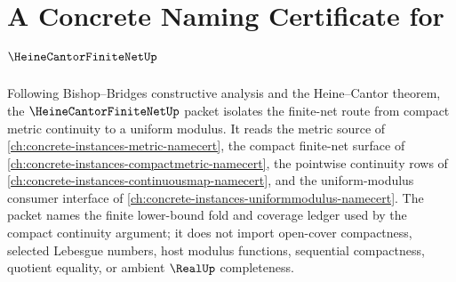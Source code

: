 \chapter{A Concrete Naming Certificate for $\HeineCantorFiniteNetUp$}
\label{ch:concrete-instances-heine-cantor-finite-net-namecert}

Following Bishop--Bridges constructive analysis and the Heine--Cantor theorem, the $\HeineCantorFiniteNetUp$ packet isolates the finite-net route from compact metric continuity to a uniform modulus. It reads the metric source of \autoref{ch:concrete-instances-metric-namecert}, the compact finite-net surface of \autoref{ch:concrete-instances-compactmetric-namecert}, the pointwise continuity rows of \autoref{ch:concrete-instances-continuousmap-namecert}, and the uniform-modulus consumer interface of \autoref{ch:concrete-instances-uniformmodulus-namecert}. The packet names the finite lower-bound fold and coverage ledger used by the compact continuity argument; it does not import open-cover compactness, selected Lebesgue numbers, host modulus functions, sequential compactness, quotient equality, or ambient $\RealUp$ completeness.

